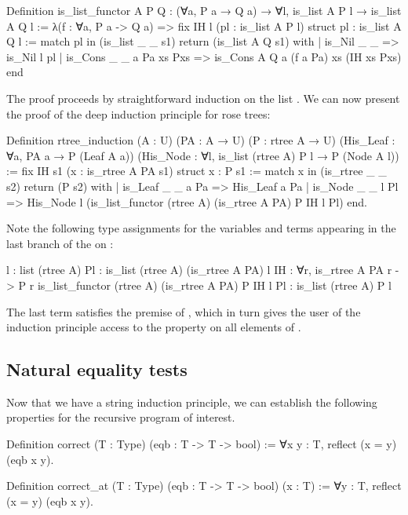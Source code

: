 \documentclass[a4paper, 11pt]{book}
\begin{document}
\begin{rocqcode}
Definition is_list_functor A P Q :
  (∀a, P a → Q a) → ∀l, is_list A P l → is_list A Q l
:=
  λ(f : ∀a, P a -> Q a) =>
    fix IH l (pl : is_list A P l) {struct pl} : is_list A Q l :=
      match pl in (is_list _ _ s1) return (is_list A Q s1) with
      | is_Nil _ _ => is_Nil l pl
      | is_Cons _ _ a Pa xs Pxs =>
          is_Cons A Q a (f a Pa) xs (IH xs Pxs)
      end
\end{rocqcode}


The proof proceeds by straightforward induction on the list . We can
now present the proof of the deep induction principle for rose trees:

\begin{rocqcode}
Definition rtree_induction (A : U) (PA : A → U) (P : rtree A → U)
    (His_Leaf : ∀a, PA a → P (Leaf A a))
    (His_Node : ∀l, is_list (rtree A) P l → P (Node A l))
:=
  fix IH s1 (x : is_rtree A PA s1) {struct x} : P s1 :=
  match x in (is_rtree _ _ s2) return (P s2) with
  | is_Leaf _ _ a Pa =>
      His_Leaf a Pa
  | is_Node _ _ l Pl =>
      His_Node l (is_list_functor (rtree A) (is_rtree A PA) P IH l Pl)
  end.
\end{rocqcode}

Note the following type assignments for the variables and terms appearing in
the last branch of the  on :

\begin{rocqcode}
l  : list (rtree A)
Pl : is_list (rtree A) (is_rtree A PA) l
IH : ∀r, is_rtree A PA r -> P r
is_list_functor (rtree A) (is_rtree A PA) P IH l Pl :
  is_list (rtree A) P l
\end{rocqcode}

The last term satisfies the premise of , which in turn gives
the user of the induction principle access to the property  on all
elements of .

\subsection{Natural equality tests}


Now that we have a string induction principle, we can establish the following
properties for the recursive program of interest.

\begin{rocqcode}
Definition correct (T : Type) (eqb : T -> T -> bool) :=
  ∀x y : T, reflect (x = y) (eqb x y).

Definition correct_at (T : Type) (eqb : T -> T -> bool) (x : T) :=
  ∀y : T, reflect (x = y) (eqb x y).
\end{rocqcode}
\end{document}
